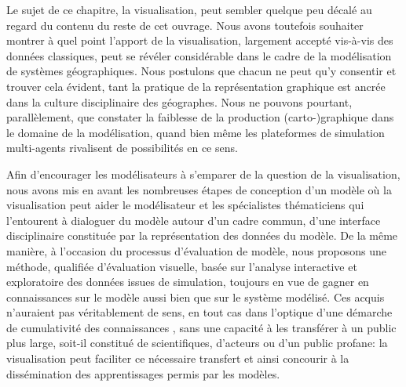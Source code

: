 \documentclass[a4paper, 12pt]{article}
\begin{document}
Le sujet de ce chapitre, la visualisation, peut sembler quelque peu décalé au regard du contenu du reste de cet ouvrage.
Nous avons toutefois souhaiter montrer à quel point l'apport de la visualisation, largement accepté vis-à-vis des données classiques, peut se révéler considérable dans le cadre de la modélisation de systèmes géographiques.
Nous postulons que chacun ne peut qu'y consentir et trouver cela évident, tant la pratique de la représentation graphique est ancrée dans la culture disciplinaire des géographes.
Nous ne pouvons pourtant, parallèlement, que constater la faiblesse de la production (carto-)graphique dans le domaine de la modélisation, quand bien même les plateformes de simulation multi-agents rivalisent de possibilités en ce sens.

Afin d'encourager les modélisateurs à s'emparer de la question de la visualisation, nous avons mis en avant les nombreuses étapes de conception d'un modèle où la visualisation peut aider le modélisateur et les spécialistes thématiciens qui l'entourent à dialoguer du modèle autour d'un cadre commun, d'une interface disciplinaire constituée par la représentation des données du modèle.
De la même manière, à l'occasion du processus d'évaluation de modèle, nous proposons une méthode, qualifiée d'évaluation visuelle, basée sur l'analyse interactive et exploratoire des données issues de simulation, toujours en vue de gagner en connaissances sur le modèle aussi bien que sur le système modélisé.
Ces acquis n'auraient pas véritablement de sens, en tout cas dans l'optique d'une démarche de cumulativité des connaissances \autocite{pumain_cumulativite_2005}, sans une capacité à les transférer à un public plus large, soit-il constitué de scientifiques, d'acteurs ou d'un public  \og profane\fg{}: la visualisation peut faciliter ce nécessaire transfert et ainsi concourir à la dissémination des apprentissages permis par les modèles.
\end{document}
